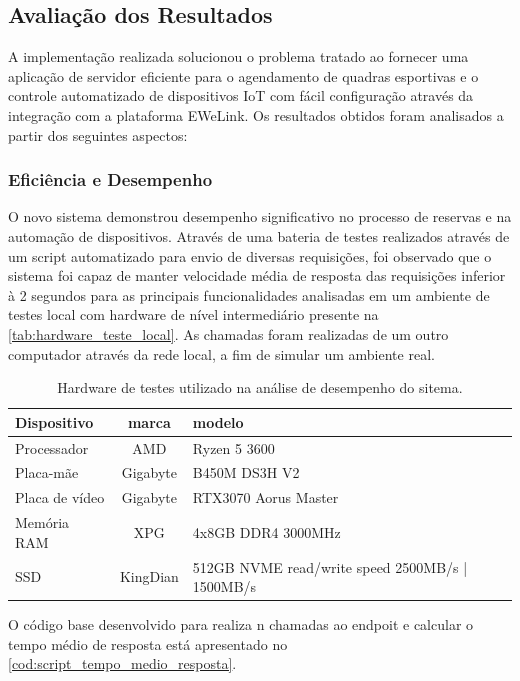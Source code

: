\subsection{Avaliação dos Resultados}

A implementação realizada solucionou o problema tratado ao fornecer uma aplicação de servidor eficiente para o agendamento de quadras esportivas e o controle automatizado de dispositivos IoT com fácil configuração através da integração com a plataforma EWeLink. Os resultados obtidos foram analisados a partir dos seguintes aspectos:

\subsubsection{Eficiência e Desempenho}

O novo sistema demonstrou desempenho significativo no processo de reservas e na automação de dispositivos. Através de uma bateria de testes realizados através de um script automatizado para envio de diversas requisições, foi observado que o sistema foi capaz de manter velocidade média de resposta das requisições inferior à 2 segundos para as principais funcionalidades analisadas em um ambiente de testes local com hardware de nível intermediário presente na \autoref{tab:hardware_teste_local}. As chamadas foram realizadas de um outro computador através da rede local, a fim de simular um ambiente real.

\begin{table}[htb]
	\centering
	\caption{\label{tab:hardware_teste_local}Hardware de testes utilizado na análise de desempenho do sitema.}	
	\begin{tabular}{|l|c|p{6cm}|}
		\hline
		\textbf{Dispositivo} & \textbf{marca} & \textbf{modelo} \\ \hline
    Processador & AMD & Ryzen 5 3600 \\ \hline
    Placa-mãe & Gigabyte & B450M DS3H V2 \\ \hline
    Placa de vídeo & Gigabyte & RTX3070 Aorus Master \\ \hline
    Memória RAM & XPG & 4x8GB DDR4 3000MHz \\ \hline
    SSD & KingDian & 512GB NVME read/write speed 2500MB/s | 1500MB/s\\ \hline
	\end{tabular}
\end{table}

O código base desenvolvido para realiza n chamadas ao endpoit e calcular o tempo médio de resposta está apresentado no \autoref{cod:script_tempo_medio_resposta}.

